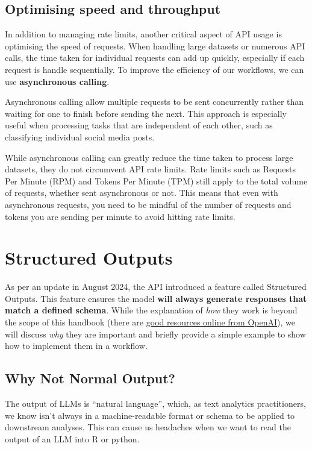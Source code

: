 \documentclass[
  letterpaper,
  DIV=11,
  numbers=noendperiod]{scrreprt}
\begin{document}
\subsection{Optimising speed and
throughput}\label{optimising-speed-and-throughput}

In addition to managing rate limits, another critical aspect of API
usage is optimising the speed of requests. When handling large datasets
or numerous API calls, the time taken for individual requests can add up
quickly, especially if each request is handle sequentially. To improve
the efficiency of our workflows, we can use \textbf{asynchronous
calling}.

Asynchronous calling allow multiple requests to be sent concurrently
rather than waiting for one to finish before sending the next. This
approach is especially useful when processing tasks that are independent
of each other, such as classifying individual social media posts.

While asynchronous calling can greatly reduce the time taken to process
large datasets, they do not circumvent API rate limits. Rate limits such
as Requests Per Minute (RPM) and Tokens Per Minute (TPM) still apply to
the total volume of requests, whether sent asynchronous or not. This
means that even with asynchronous requests, you need to be mindful of
the number of requests and tokens you are sending per minute to avoid
hitting rate limits.

\section{Structured Outputs}\label{structured-outputs}

As per an update in August 2024, the API introduced a feature called
Structured Outputs. This feature ensures the model \textbf{will always
generate responses that match a defined schema}. While the explanation
of \emph{how} they work is beyond the scope of this handbook (there are
\href{https://openai.com/index/introducing-structured-outputs-in-the-api/}{good
resources online from OpenAI}), we will discuss \emph{why} they are
important and briefly provide a simple example to show how to implement
them in a workflow.

\subsection{Why Not Normal Output?}\label{why-not-normal-output}

The output of LLMs is ``natural language'', which, as text analytics
practitioners, we know isn't always in a machine-readable format or
schema to be applied to downstream analyses. This can cause us headaches
when we want to read the output of an LLM into R or python.
\end{document}
